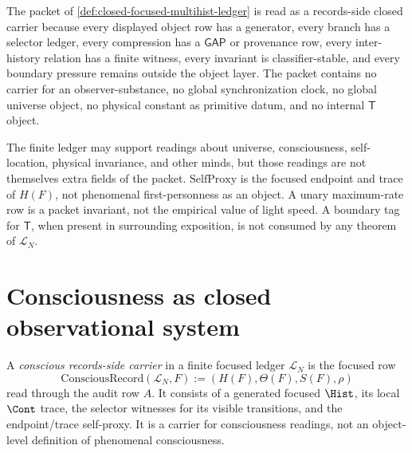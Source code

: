 \begin{principle}
\label{prin:consciousness-universe-closed-means-ledgered}
The packet of \autoref{def:closed-focused-multihist-ledger} is read as a records-side closed carrier because every displayed object row has a generator, every branch has a selector ledger, every compression has a $\mathsf{GAP}$ or provenance row, every inter-history relation has a finite witness, every invariant is classifier-stable, and every boundary pressure remains outside the object layer. The packet contains no carrier for an observer-substance, no global synchronization clock, no global universe object, no physical constant as primitive datum, and no internal $\mathsf{T}$ object.
\end{principle}

\begin{remark}
\label{rem:consciousness-universe-boundary-readings}
The finite ledger may support readings about universe, consciousness, self-location, physical invariance, and other minds, but those readings are not themselves extra fields of the packet. $\mathrm{SelfProxy}$ is the focused endpoint and trace of $H(F)$, not phenomenal first-personness as an object. A unary maximum-rate row is a packet invariant, not the empirical value of light speed. A boundary tag for $\mathsf{T}$, when present in surrounding exposition, is not consumed by any theorem of $\mathcal{L}_N$.
\end{remark}

\section{Consciousness as closed observational system}
\label{sec:consciousness-universe-consciousness-as-closed}

\begin{definition}
\label{def:consciousness-universe-consciousness-reading}
A \emph{conscious records-side carrier} in a finite focused ledger $\mathcal{L}_N$ is the focused row
$$
\mathrm{ConsciousRecord}(\mathcal{L}_N,F)
  := (H(F),\Theta(F),S(F),\rho)
$$
read through the audit row $A$. It consists of a generated focused $\Hist$, its local $\Cont$ trace, the selector witnesses for its visible transitions, and the endpoint/trace self-proxy. It is a carrier for consciousness readings, not an object-level definition of phenomenal consciousness.
\end{definition}

